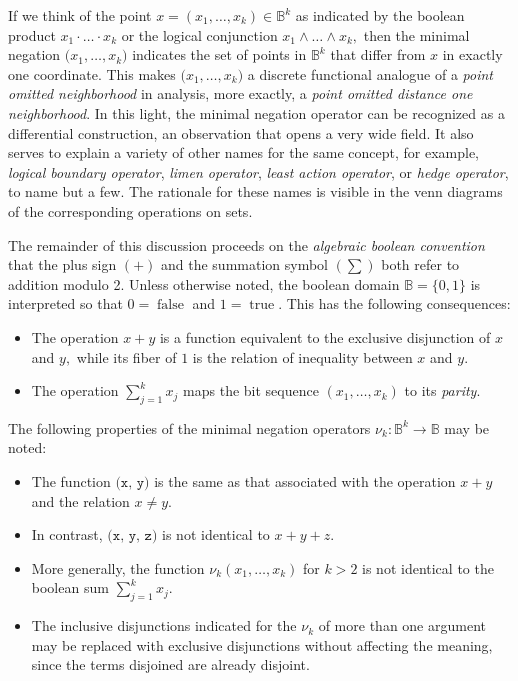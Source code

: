 \documentclass[12pt]{article}
\begin{document}
If we think of the point $x = (x_1, \ldots, x_k) \in \mathbb{B}^k$ as indicated by the boolean product $x_1 \cdot \ldots \cdot x_k$ or the logical conjunction $x_1 \land \ldots \land x_k,$ then the minimal negation $\texttt{(} x_1, \ldots, x_k \texttt{)}$ indicates the set of points in $\mathbb{B}^k$ that differ from $x$ in exactly one coordinate.  This makes $\texttt{(} x_1, \ldots, x_k \texttt{)}$ a discrete functional analogue of a \textit{point omitted neighborhood} in analysis, more exactly, a \textit{point omitted distance one neighborhood}.  In this light, the minimal negation operator can be recognized as a differential construction, an observation that opens a very wide field.  It also serves to explain a variety of other names for the same concept, for example, \textit{logical boundary operator}, \textit{limen operator}, \textit{least action operator}, or \textit{hedge operator}, to name but a few.  The rationale for these names is visible in the venn diagrams of the corresponding operations on sets.

The remainder of this discussion proceeds on the \textit{algebraic boolean convention} that the plus sign $(+)$ and the summation symbol $(\textstyle\sum)$ both refer to addition modulo 2.  Unless otherwise noted, the boolean domain $\mathbb{B} = \{ 0, 1 \}$ is interpreted so that $0 = \operatorname{false}$ and $1 = \operatorname{true}.$  This has the following consequences:

\begin{itemize}

\item
The operation $x + y$ is a function equivalent to the exclusive disjunction of $x$ and $y,$ while its fiber of $1$ is the relation of inequality between $x$ and $y.$

\item
The operation $\textstyle\sum_{j=1}^k x_j$ maps the bit sequence $(x_1, \ldots, x_k)$ to its \textit{parity}.

\end{itemize}

The following properties of the minimal negation operators $\nu_k : \mathbb{B}^k \to \mathbb{B}$ may be noted:

\begin{itemize}

\item
The function $\texttt{(x, y)}$ is the same as that associated with the operation $x + y$ and the relation $x \ne y.$

\item
In contrast, $\texttt{(x, y, z)}$ is not identical to $x + y + z.$

\item
More generally, the function $\nu_k (x_1, \dots, x_k)$ for $k > 2$ is not identical to the boolean sum $\textstyle\sum_{j=1}^k x_j.$

\item
The inclusive disjunctions indicated for the $\nu_k$ of more than one argument may be replaced with exclusive disjunctions without affecting the meaning, since the terms disjoined are already disjoint.

\end{itemize}
\end{document}
